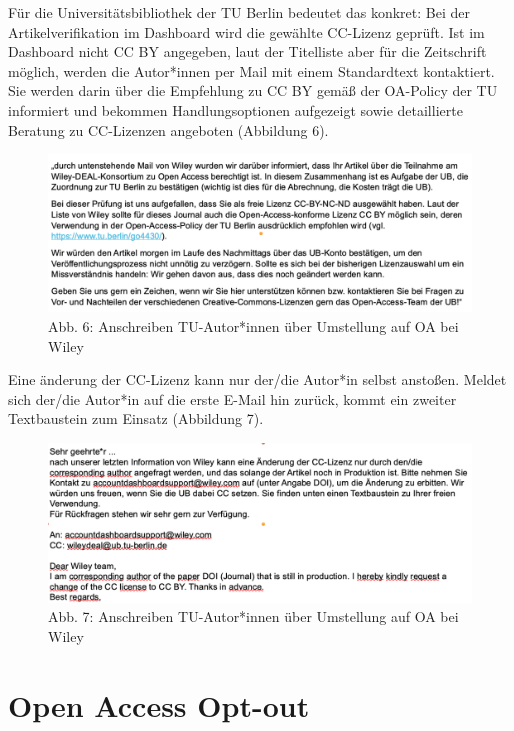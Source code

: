 \documentclass[a4paper,
fontsize=11pt,
oneside,
numbers=noperiodatend,
parskip=half-,
bibliography=totoc,
final
]{scrartcl}
\begin{document}
Für die Universitätsbibliothek der TU Berlin bedeutet das konkret: Bei
der Artikelverifikation im Dashboard wird die gewählte CC-Lizenz
geprüft. Ist im Dashboard nicht CC BY angegeben, laut der Titelliste
aber für die Zeitschrift möglich, werden die Autor*innen per Mail mit
einem Standardtext kontaktiert. Sie werden darin über die Empfehlung zu
CC BY gemäß der OA-Policy der TU informiert und bekommen
Handlungsoptionen aufgezeigt sowie detaillierte Beratung zu CC-Lizenzen
angeboten (Abbildung 6).

\begin{figure}
\centering
\includegraphics{img/WileyretroOAauthor.png}
\caption{Abb. 6: Anschreiben TU-Autor*innen über Umstellung auf OA bei
Wiley}
\end{figure}

Eine änderung der CC-Lizenz kann nur der/die Autor*in selbst anstoßen.
Meldet sich der/die Autor*in auf die erste E-Mail hin zurück, kommt ein
zweiter Textbaustein zum Einsatz (Abbildung 7).

\begin{figure}
\centering
\includegraphics{img/WileyretroOAauthor2.png}
\caption{Abb. 7: Anschreiben TU-Autor*innen über Umstellung auf OA bei
Wiley}
\end{figure}

\hypertarget{open-access-opt-out}{%
\section{Open Access Opt-out}\label{open-access-opt-out}}
\end{document}
